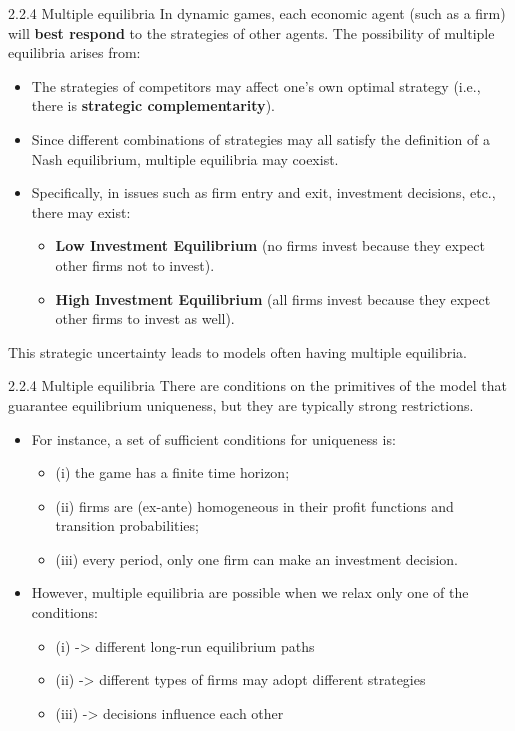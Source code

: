 \documentclass[aspectratio=169]{beamer}  %
\begin{document}
\begin{frame}{2.2.4 Multiple equilibria}
In dynamic games, each economic agent (such as a firm) will \textbf{best respond} to the strategies of other agents. The possibility of multiple equilibria arises from:
    \begin{itemize}
        \item The strategies of competitors may affect one's own optimal strategy (i.e., there is \textbf{strategic complementarity}).
        \item Since different combinations of strategies may all satisfy the definition of a Nash equilibrium, multiple equilibria may coexist.
        \item Specifically, in issues such as firm entry and exit, investment decisions, etc., there may exist:
        \begin{itemize}
            \item \textbf{Low Investment Equilibrium} (no firms invest because they expect other firms not to invest).
            \item \textbf{High Investment Equilibrium} (all firms invest because they expect other firms to invest as well).
        \end{itemize}
    \end{itemize}
This strategic uncertainty leads to models often having multiple equilibria.
\end{frame}


\begin{frame}
{2.2.4 Multiple equilibria}
There are conditions on the primitives of the model that guarantee equilibrium uniqueness, but they are typically strong restrictions.
\begin{itemize}
    \item For instance, a set of sufficient conditions for uniqueness is:
    \begin{itemize}
        \item (i) the game has a finite time horizon;
        \item (ii) firms are (ex-ante) homogeneous in their profit functions and transition probabilities;
        \item (iii) every period, only one firm can make an investment decision.
    \end{itemize}
    
    \item However, multiple equilibria are possible when we relax only one of the conditions:
    \begin{itemize}
        \item (i) -> different long-run equilibrium paths
        \item (ii) -> different types of firms may adopt different strategies
        \item (iii) -> decisions influence each other
    \end{itemize}
\end{itemize}

\end{frame}
\end{document}

